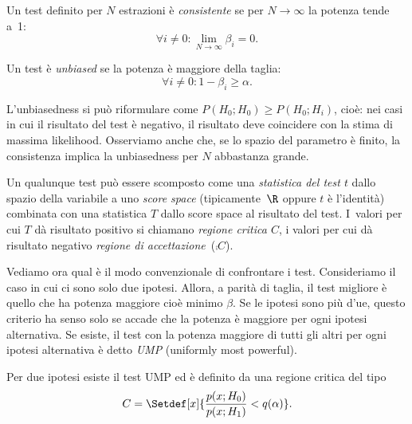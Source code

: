 \begin{definition}[Consistenza]
	Un test definito per $N$ estrazioni è \emph{consistente}
	se per $N\to\infty$ la potenza tende a~1:
	\begin{equation*}
		\forall i\neq0:
		\lim_{N\to\infty} \beta_i = 0.
	\end{equation*}
\end{definition}

\begin{definition}[Unbiasedness]
	Un test è \emph{unbiased}
	se la potenza è maggiore della taglia:
	\begin{equation*}
		\forall i\neq0:
		1-\beta_i \ge \alpha.
	\end{equation*}
\end{definition}

L'unbiasedness si può riformulare come $P(H_0;H_0)\ge P(H_0;H_i)$,
cioè: nei casi in cui il risultato del test è negativo,
il risultato deve coincidere con la stima di massima likelihood.
Osserviamo anche che,
se lo spazio del parametro è finito,
la consistenza implica la unbiasedness per $N$ abbastanza grande.

\begin{definition}	
	Un qualunque test può essere scomposto come una \emph{statistica del test $t$}
	dallo spazio della variabile a uno \emph{score space} (tipicamente~$\R$ oppure $t$ è l'identità)
	combinata con una statistica $T$ dallo score space al risultato del test.
	I~valori per cui $T$ dà risultato positivo si chiamano \emph{regione critica $C$},
	i valori per cui dà risultato negativo \emph{regione di accettazione}~($\comp C$).
\end{definition}


Vediamo ora qual è il modo convenzionale di confrontare i test.
Consideriamo il caso in cui ci sono solo due ipotesi.
Allora, a parità di taglia,
il test migliore è quello che ha potenza maggiore cioè minimo $\beta$.
Se le ipotesi sono più d'ue,
questo criterio ha senso solo se accade che la potenza è maggiore per ogni ipotesi alternativa.
Se esiste, il test con la potenza maggiore di tutti gli altri per ogni ipotesi alternativa è detto
\emph{UMP} (uniformly most powerful).

\begin{theorem}
	\label{th:np}
	Per due ipotesi esiste il test UMP
	ed è definito da una regione critica del tipo
	\begin{equation*}
		C = \Setdef[x]{\frac{p(x;H_0)}{p(x;H_1)} < q(\alpha)}.
	\end{equation*}
\end{theorem}

